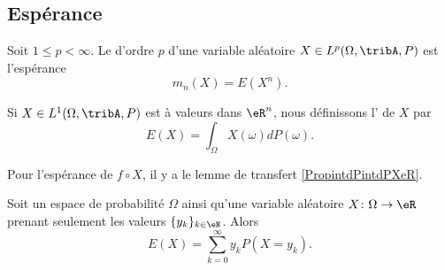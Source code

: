 \subsection{Espérance}

\begin{definition}
	Soit \( 1\leq p<\infty\). Le  d'ordre \( p\) d'une variable aléatoire \( X\in L^p(\Omega,\tribA,P)\) est l'espérance
	\begin{equation}
		m_n(X)=E(X^n).
	\end{equation}
\end{definition}

\begin{definition}      \label{DEFooQKFBooCBZtRG}
	Si \( X\in L^1(\Omega,\tribA,P)\) est à valeurs dans \( \eR^n\), nous définissons l' de \( X\) par
	\begin{equation}        \label{EqdCBLst}
        E(X)=\int_{\Omega}X(\omega)dP(\omega).
	\end{equation}
\end{definition}

Pour l'espérance de \( f\circ X\), il y a le lemme de transfert \ref{PropintdPintdPXeR}.

\begin{lemma}        \label{LEMooEHTYooWmMAgf}
	Soit un espace de probabilité \( \Omega\) ainsi qu'une variable aléatoire \( X\colon \Omega\to \eR\) prenant seulement les valeurs \( \{ y_k \}_{k\in \eN}\). Alors
	\begin{equation}
		E(X)=\sum_{k=0}^{\infty}y_kP(X=y_k).
	\end{equation}
\end{lemma}

